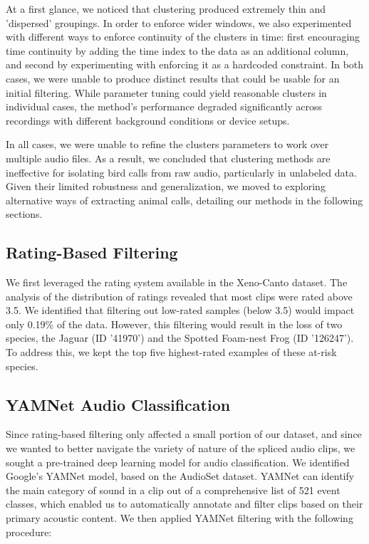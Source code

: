 \documentclass[11pt]{article}
\begin{document}
At a first glance, we noticed that clustering produced extremely thin and 'dispersed' groupings. In order to enforce wider windows, we also experimented with different ways to enforce continuity of the clusters in time: first encouraging time continuity by adding the time index to the data as an additional column, and second by experimenting with enforcing it as a hardcoded constraint. In both cases, we were unable to produce distinct results that could be usable for an initial filtering. While parameter tuning could yield reasonable clusters in individual cases, the method's performance degraded significantly across recordings with different background conditions or device setups.

In all cases, we were unable to refine the clusters parameters to work over multiple audio files. As a result, we concluded that clustering methods are ineffective for isolating bird calls from raw audio, particularly in unlabeled data. Given their limited robustness and generalization, we moved to exploring alternative ways of extracting animal calls, detailing our methods in the following sections.

\subsection*{Rating-Based Filtering}

We first leveraged the rating system available in the Xeno-Canto dataset. The analysis of the distribution of ratings revealed that most clips were rated above 3.5. We identified that filtering out low-rated samples (below 3.5) would impact only 0.19\% of the data. However, this filtering would result in the loss of two species, the Jaguar (ID '41970') and the Spotted Foam-nest Frog (ID '126247'). To address this, we kept the top five highest-rated examples of these at-risk species.

\subsection*{YAMNet Audio Classification}

Since rating-based filtering only affected a small portion of our dataset, and since we wanted to better navigate the variety of nature of the spliced audio clips, we sought a pre-trained deep learning model for audio classification. We identified Google's YAMNet model,  based on the AudioSet dataset. YAMNet can identify the main category of sound in a clip out of a comprehensive list of 521 event classes, which enabled us to automatically annotate and filter clips based on their primary acoustic content. We then applied YAMNet filtering with the following procedure:
\end{document}
